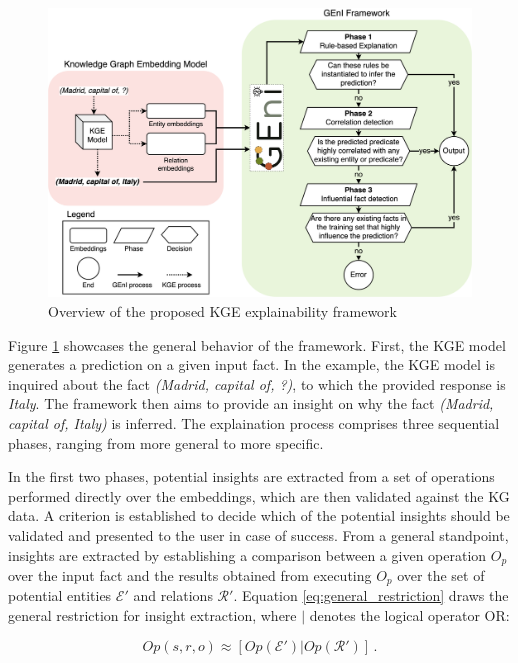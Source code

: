 \begin{figure}[t]
    \centering
    \includegraphics[width=\linewidth]{6_kbsextractiondl/figures/geni_overview.eps}
    \caption{Overview of the proposed KGE explainability framework}
    \label{fig:overview_geni}
\end{figure}

Figure \ref{fig:overview_geni} showcases the general behavior of the framework. First, the KGE model generates a prediction on a given input fact. In the example, the KGE model is inquired about the fact \textit{(Madrid, capital of, ?)}, to which the provided response is \textit{Italy}. The framework then aims to provide an insight on why the fact \textit{(Madrid, capital of, Italy)} is inferred. The explaination process comprises three sequential phases, ranging from more general to more specific. 

In the first two phases, potential insights are extracted from a set of operations performed directly over the embeddings, which are then validated against the KG data. A criterion is established to decide which of the potential insights should be validated and presented to the user in case of success. From a general standpoint, insights are extracted by establishing a comparison between a given operation $O_p$ over the input fact and the results obtained from executing $O_p$ over the set of potential entities $\mathcal{E}'$ and relations $\mathcal{R}'$. Equation \ref{eq:general_restriction} draws the general restriction for insight extraction, where $|$ denotes the logical operator OR:

\begin{equation}\label{eq:general_restriction}
    Op(s,r,o)\approx [Op(\mathcal{E}') | Op(\mathcal{R}')]\,.
\end{equation}

